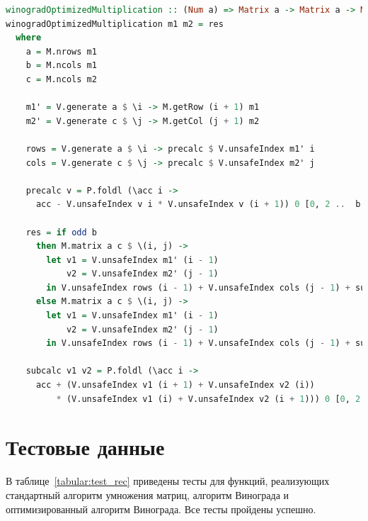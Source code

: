 \documentclass[12pt]{report}
\begin{document}
\begin{lstlisting}[label=some-code,caption=Функция нахождения расстояния Дамерау-Левенштейна матрично,language=Haskell]
winogradOptimizedMultiplication :: (Num a) => Matrix a -> Matrix a -> Matrix a
winogradOptimizedMultiplication m1 m2 = res
  where
    a = M.nrows m1
    b = M.ncols m1
    c = M.ncols m2
	
    m1' = V.generate a $ \i -> M.getRow (i + 1) m1
    m2' = V.generate c $ \j -> M.getCol (j + 1) m2
	
    rows = V.generate a $ \i -> precalc $ V.unsafeIndex m1' i
    cols = V.generate c $ \j -> precalc $ V.unsafeIndex m2' j
	
    precalc v = P.foldl (\acc i ->
      acc - V.unsafeIndex v i * V.unsafeIndex v (i + 1)) 0 [0, 2 ..  b - 2]
	
    res = if odd b
      then M.matrix a c $ \(i, j) ->
        let v1 = V.unsafeIndex m1' (i - 1)
            v2 = V.unsafeIndex m2' (j - 1)
        in V.unsafeIndex rows (i - 1) + V.unsafeIndex cols (j - 1) + subcalc v1 v2 + V.last v1 * V.last v2
      else M.matrix a c $ \(i, j) ->
        let v1 = V.unsafeIndex m1' (i - 1)
            v2 = V.unsafeIndex m2' (j - 1)
        in V.unsafeIndex rows (i - 1) + V.unsafeIndex cols (j - 1) + subcalc v1 v2
	
    subcalc v1 v2 = P.foldl (\acc i ->
      acc + (V.unsafeIndex v1 (i + 1) + V.unsafeIndex v2 (i))
          * (V.unsafeIndex v1 (i) + V.unsafeIndex v2 (i + 1))) 0 [0, 2 .. b - 2]
\end{lstlisting}

\section{Тестовые данные}

В таблице~\ref{tabular:test_rec} приведены тесты для функций, реализующих стандартный алгоритм умножения матриц, алгоритм Винограда и оптимизированный алгоритм Винограда. Все тесты пройдены успешно.
\end{document}
